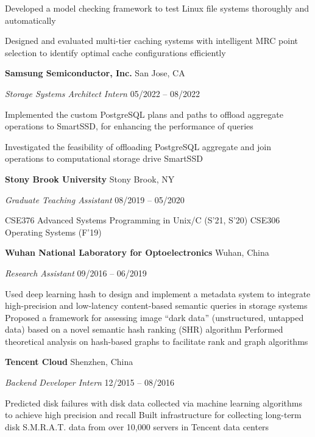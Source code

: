 \documentclass[letterpaper,10pt,oneside]{article}
\begin{document}
\begin{body}
\GapNoBreak
\BulletItem
Developed a model checking framework to test Linux file systems thoroughly and automatically

\GapNoBreak
\BulletItem
Designed and evaluated multi-tier caching systems with intelligent MRC point selection to identify optimal cache configurations efficiently

\BigGap
{\textbf{Samsung Semiconductor, Inc.}}
\hfill
San Jose, CA

\emph{Storage Systems Architect Intern}
\hfill
05/2022 --
08/2022

\GapNoBreak
\BulletItem
Implemented the custom PostgreSQL plans and paths to offload aggregate operations to SmartSSD, for enhancing the performance of queries

\GapNoBreak
\BulletItem
Investigated the feasibility of offloading PostgreSQL aggregate and join operations to computational storage drive SmartSSD

\BigGap
{\textbf{Stony Brook University}}
\hfill
Stony Brook, NY

\emph{Graduate Teaching Assistant}
\hfill
08/2019 --
05/2020

\GapNoBreak
\BulletItem
CSE376 Advanced Systems Programming in Unix/C (S'21, S'20) 
\GapNoBreak
\BulletItem
CSE306 Operating Systems (F'19) 

\BigGap
{\textbf{Wuhan National Laboratory for Optoelectronics}}
\hfill
Wuhan, China

\emph{Research Assistant}
\hfill
09/2016 --
06/2019

\GapNoBreak
\BulletItem
Used deep learning hash to design and implement a metadata system to integrate high-precision and low-latency content-based semantic queries in storage systems
\GapNoBreak
\BulletItem
Proposed a framework for assessing image ``dark data'' (unstructured, untapped data) based on a novel semantic hash ranking (SHR) algorithm
\GapNoBreak
\BulletItem
Performed theoretical analysis on hash-based graphs to facilitate rank and graph algorithms 

\BigGap
{\textbf{Tencent Cloud}} 
\hfill
Shenzhen, China

\emph{Backend Developer Intern}
\hfill
12/2015 --
08/2016

\GapNoBreak
\BulletItem
Predicted disk failures with disk data collected via machine learning algorithms to achieve high precision and recall
\GapNoBreak
\BulletItem
Built infrastructure for collecting long-term disk S.M.R.A.T. data from over 10,000 servers in Tencent data centers


\end{body}
\end{document}
